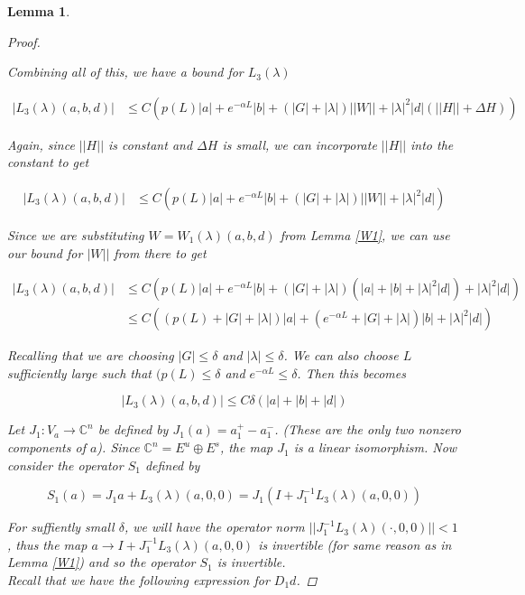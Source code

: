 \documentclass[12pt]{article}
\def\C{{\mathbb C}}
\newtheorem{lemma}{Lemma}
\begin{document}
\begin{lemma}
\begin{proof}
\begin{enumerate}
\end{enumerate}

Combining all of this, we have a bound for $L_3(\lambda)$

\begin{align*}
|L_3(\lambda)(a,b,d)| &\leq C \left( p(L)|a| + e^{-\alpha L}|b| + (|G| + |\lambda|)||W|| + |\lambda|^2|d|(||H|| + \Delta H ) \right)
\end{align*}

Again, since $||H||$ is constant and $\Delta H$ is small, we can incorporate $||H||$ into the constant to get 

\begin{align*}
|L_3(\lambda)(a,b,d)| &\leq C \left( p(L)|a| + e^{-\alpha L}|b| + (|G| + |\lambda|)||W|| + |\lambda|^2|d| \right)
\end{align*}

Since we are substituting $W = W_1(\lambda)(a,b,d)$ from Lemma \ref{W1}, we can use our bound for $|W||$ from there to get

\begin{align*}
|L_3(\lambda)(a,b,d)| &\leq C \left( p(L)|a| + e^{-\alpha L}|b| + (|G| + |\lambda|)(|a| + |b| + |\lambda|^2 |d|) + |\lambda|^2|d| \right) \\
&\leq C \left( (p(L) + |G| + |\lambda|)|a| + (e^{-\alpha L} + |G| + |\lambda|)|b| + |\lambda|^2|d| \right)
\end{align*}

Recalling that we are choosing $|G|\leq \delta$ and $|\lambda| \leq \delta$. We can also choose $L$ sufficiently large such that $(p(L) \leq \delta$ and $e^{-\alpha L} \leq \delta$. Then this becomes 

\[
|L_3(\lambda)(a,b,d)| \leq C\delta(|a| + |b| + |d|)
\]

Let $J_1: V_a \rightarrow \C^n$ be defined by $J_1(a) = a_1^+ - a_1^-$. (These are the only two nonzero components of $a$). Since $\C^n = E^u \oplus E^s$, the map $J_1$ is a linear isomorphism. Now consider the operator $S_1$ defined by

\[
S_1(a) = J_1 a + L_3(\lambda)(a, 0, 0) = J_1( I + J_1^{-1} L_3(\lambda)(a, 0, 0) )
\]

For suffiently small $\delta$, we will have the operator norm $||J_1^{-1} L_3(\lambda)(\cdot, 0, 0)|| < 1$, thus the map $a \rightarrow I + J_1^{-1} L_3(\lambda)(a, 0, 0)$ is invertible (for same reason as in Lemma \ref{W1}) and so the operator $S_1$ is invertible.\\

Recall that we have the following expression for $D_1 d$.


\end{proof}
\end{lemma}
\end{document}
